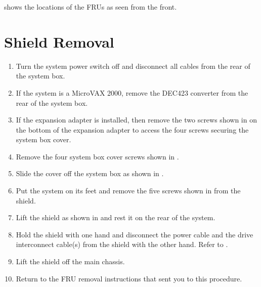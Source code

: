  shows the locations of the FRUs as seen from the front.


\newpage

\section{Shield Removal}

\begin{enumerate}

\item	Turn the system power switch off and disconnect all cables from the
		rear of the system box.

\item	If the system is a MicroVAX 2000, remove the DEC423 converter from
		the rear of the system box.

\item	If the expansion adapter is installed, then remove the two screws shown
		in  on the bottom of the expansion adapter to access the four
		screws securing the system box cover.

\newpage

\item	Remove the four system box cover screws shown in .

\newpage

\item	Slide the cover off the system box as shown in .

\newpage

\item	Put the system on its feet and remove the five screws shown in
		 from the shield.

\newpage

\item	Lift the shield as shown in  and rest it on the rear of the
		system.

\newpage

\item	Hold the shield with one hand and disconnect the power cable and the
		drive interconnect cable(s) from the shield with the other hand. Refer
		to .


\item	Lift the shield off the main chassis.

\item	Return to the FRU removal instructions that sent you to this procedure.
\end{enumerate}

